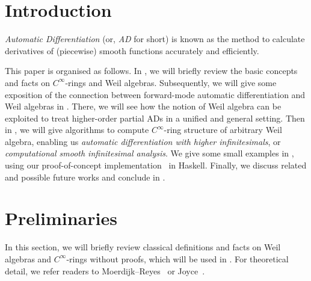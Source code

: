 \documentclass[%
  sigconf,authorversion,screen]{acmart}
\begin{document}
  

\maketitle

\section{Introduction}\label{sec:intro}
\sloppy
\emph{Automatic Differentiation} (or, \emph{AD} for short) is known as the method to calculate derivatives of (piecewise) smooth functions accurately and efficiently.

This paper is organised as follows.
In , we will briefly review the basic concepts and facts on $C^\infty$-rings and Weil algebras.
Subsequently, we will give some exposition of the connection between forward-mode automatic differentiation and Weil algebras in .
There, we will see how the notion of Weil algebra can be exploited to treat higher-order partial ADs in a unified and general setting.
Then in , we will give algorithms to compute $C^\infty$-ring structure of arbitrary Weil algebra, enabling us \emph{automatic differentiation with higher infinitesimals}, or \emph{computational smooth infinitesimal analysis}.
We give some small examples in , using our proof-of-concept implementation~\cite{Ishii:2020aa} in Haskell.
Finally, we discuss related and possible future works and conclude in .

\section{Preliminaries}\label{sec:prel}
In this section, we will briefly review classical definitions and facts on Weil algebras and $C^\infty$-rings without proofs, which will be used in .
For theoretical detail, we refer readers to Moerdijk--Reyes~\cite[Chapters I and II]{Moerdijk:1991aa} or Joyce~\cite{joyce2016algebraic}.
\end{document}
